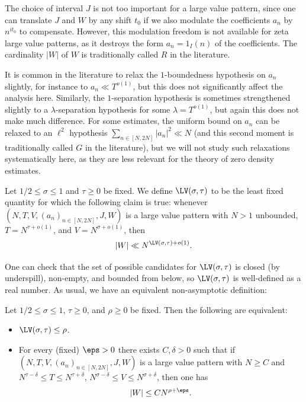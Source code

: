 The choice of interval $J$ is not too important for a large value pattern, since one can translate $J$ and $W$ by any shift $t_0$ if we also modulate the coefficients $a_n$ by $n^{it_0}$ to compensate.  However, this modulation freedom is not available for zeta large value patterns, as it destroys the form $a_n = 1_I(n)$ of the coefficients.  The cardinality $|W|$ of $W$ is traditionally called $R$ in the literature.

It is common in the literature to relax the $1$-boundedness hypothesis on $a_n$ slightly, for instance to $a_n \ll T^{o(1)}$, but this does not significantly affect the analysis here.  Similarly, the $1$-separation hypothesis is sometimes strengthened slightly to a $\lambda$-separation hypothesis for some $\lambda = T^{o(1)}$, but again this does not make much difference.  For some estimates, the uniform bound on $a_n$ can be relaxed to an $\ell^2$ hypothesis $\sum_{n \in [N,2N]} |a_n|^2 \ll N$ (and this second moment is traditionally called $G$ in the literature), but we will not study such relaxations systematically here, as they are less relevant for the theory of zero density estimates.

\begin{definition}\label{lv-def} Let $1/2 \leq \sigma \leq 1$ and $\tau \geq 0$ be fixed. We define $\LV(\sigma,\tau)$ to be the least fixed quantity for which the following claim is true: whenever $(N,T,V,(a_n)_{n \in [N,2N]},J,W)$ is a large value pattern with $N>1$ unbounded, $T = N^{\tau+o(1)}$, and $V = N^{\sigma+o(1)}$, then
$$ |W| \ll N^{\LV(\sigma,\tau)+o(1)}.$$
\end{definition}


One can check that the set of possible candidates for $\LV(\sigma,\tau)$ is closed (by underspill), non-empty, and bounded from below, so $\LV(\sigma,\tau)$ is well-defined as a real number.  As usual, we have an equivalent non-asymptotic definition:

\begin{lemma}\label{lv-asymp} Let $1/2 \leq \sigma \leq 1$, $\tau \geq 0$, and $\rho \geq 0$ be fixed.  Then the following are equivalent:
    \begin{itemize}
    \item[(i)] $\LV(\sigma,\tau) \leq \rho$.
    \item[(ii)] For every (fixed)  $\eps>0$ there exists $C, \delta>0$ such that if $(N,T,V,(a_n)_{n \in [N,2N]},J,W)$ is a large value pattern with $N \geq C$ and $N^{\tau-\delta} \leq T \leq N^{\tau+\delta}$, $N^{\sigma-\delta} \leq V \leq N^{\sigma+\delta}$, then one has
    $$ |W| \leq C N^{\rho+\eps}.$$
    \end{itemize}
\end{lemma}

